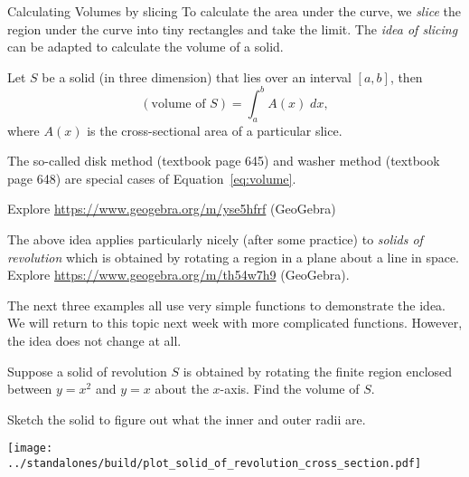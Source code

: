 \documentclass[../main.tex]{subfiles}
\begin{document}
\begin{lesson}{Calculating Volumes by slicing}
  To calculate the area under the curve, we \emph{slice} the region under the curve into tiny rectangles and take the limit. The \emph{idea of slicing} can be adapted to calculate the volume of a solid.

  \begin{mdframed}[style=withref-compact]
    Let \(S\) be a solid (in three dimension) that lies over an interval \([a,b]\), then
    \begin{equation} \label{eq:volume}
      (\text{volume of } S) = \int_{a}^{b} A(x) \;dx,
    \end{equation}
    where \(A(x)\) is the cross-sectional area of a particular slice.

    The so-called disk method (textbook page 645) and washer method (textbook page 648) are special cases of Equation~\eqref{eq:volume}.
  \end{mdframed}

  {\footnotesize Explore \url{https://www.geogebra.org/m/yse5hfrf} (GeoGebra)}


  The above idea applies particularly nicely (after some practice) to \emph{solids of revolution} which is obtained by rotating a region in a plane about a line in space. \\
  {\footnotesize Explore \url{https://www.geogebra.org/m/th54w7h9} (GeoGebra).}
  \clearpage


  The next three examples all use very simple functions to demonstrate the idea. We will return to this topic next week with more complicated functions. However, the idea does not change at all.

  \begin{example}
    Suppose a solid of revolution \(S\) is obtained by rotating the finite region enclosed between \(y = x^{2}\) and \(y = x\) about the \(x\)-axis. Find the volume of \(S\).


    Sketch the solid to figure out what the inner and outer radii are.

    \texttt{[image: ../standalones/build/plot\_solid\_of\_revolution\_cross\_section.pdf]}
  \end{example}
  \clearpage


\end{lesson}
\end{document}
